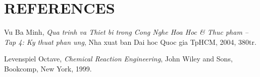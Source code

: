 \section{REFERENCES}

\begin{enumerate}[label={[\arabic*]}]
    \item Vu Ba Minh, \textit{Qua trinh va Thiet bi trong Cong Nghe Hoa Hoc \& Thuc pham -- Tap 4: Ky thuat phan ung}, Nha xuat ban Dai hoc Quoc gia TpHCM, 2004, 380tr.
    \item Levenspiel Octave, \textit{Chemical Reaction Engineering}, John Wiley and Sons, Bookcomp, New York, 1999.
\end{enumerate}
